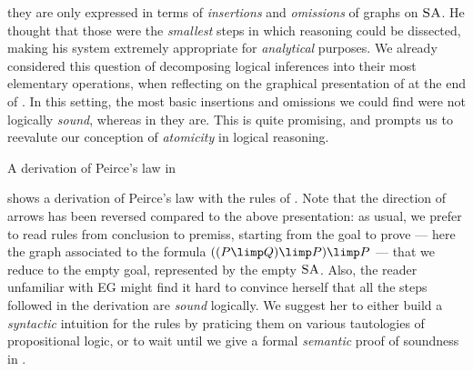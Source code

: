 they are only expressed in terms of \emph{insertions} and \emph{omissions} of
graphs on $\textsc{SA}$. He thought that those were the \emph{smallest} steps in which
reasoning could be dissected, making his system extremely appropriate for
\emph{analytical} purposes.
We already considered this question of decomposing logical inferences into their
most elementary operations, when reflecting on the graphical presentation of
 at the end of . In this setting, the
most basic insertions and omissions we could find were not logically
\emph{sound}, whereas in  they are. This is quite promising, and
prompts us to reevalute our conception of \emph{atomicity} in logical reasoning.

\begin{marginfigure}
  
  \caption{A derivation of Peirce's law in }
\end{marginfigure}

 shows a derivation of Peirce's law with the rules of
. Note that the direction of arrows has been reversed compared to the
above presentation: as usual, we prefer to read rules from conclusion to
premiss, starting from the goal to prove --- here the graph associated to the
formula $((P \limp Q) \limp P) \limp P$ --- that we reduce to the empty goal,
represented by the empty $\textsc{SA}$. Also, the reader unfamiliar with EG might find
it hard to convince herself that all the steps followed in the derivation are
\emph{sound} logically. We suggest her to either build a \emph{syntactic}
intuition for the rules by praticing them on various tautologies of
propositional logic, or to wait until we give a formal \emph{semantic} proof of
soundness in .


